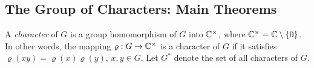 

\subsection{The Group of Characters: Main Theorems}
A \emph{character} of $G$ is a group homomorphism of $G$
into $\mathbb{C}^{\times}$, where $\mathbb{C}^{\times} = \mathbb{C} \setminus \{0\}$.
In other words, the mapping $\varrho: G \to \mathbb{C}^{\times}$ is 
a character of $G$ if it satisfies 
$\varrho(xy) = \varrho(x)\varrho(y), \, x, y \in G$.
Let $G^*$ denote the set of all characters of $G$.

